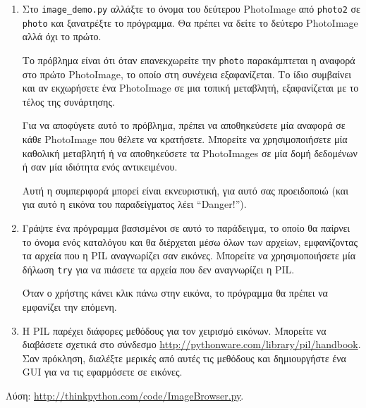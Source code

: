 \documentclass[10pt]{book}
\begin{document}
\begin{exercise}
\begin{enumerate}
\item Στο \verb"image_demo.py" αλλάξτε το όνομα του δεύτερου PhotoImage από {\tt photo2} σε {\tt photo}
και ξανατρέξτε το πρόγραμμα.  Θα πρέπει να δείτε το δεύτερο PhotoImage αλλά όχι το πρώτο.

Το πρόβλημα είναι ότι όταν επανεκχωρείτε την {\tt photo} παρακάμπτεται η αναφορά στο πρώτο PhotoImage,
το οποίο στη συνέχεια εξαφανίζεται.  Το ίδιο συμβαίνει και αν εκχωρήσετε ένα PhotoImage σε μια τοπική
μεταβλητή, εξαφανίζεται με το τέλος της συνάρτησης.

Για να αποφύγετε αυτό το πρόβλημα, πρέπει να αποθηκεύσετε μία αναφορά σε κάθε PhotoImage που θέλετε να κρατήσετε.  Μπορείτε να χρησιμοποιήσετε μία καθολική μεταβλητή ή να αποθηκεύσετε τα PhotoImages σε μία δομή δεδομένων ή
σαν μία ιδιότητα ενός αντικειμένου.

Αυτή η συμπεριφορά μπορεί είναι εκνευριστική, για αυτό σας προειδοποιώ (και για αυτό η εικόνα του παραδείγματος
λέει ``Danger!'').

\item Γράψτε ένα πρόγραμμα βασισμένοι σε αυτό το παράδειγμα, το οποίο θα παίρνει το όνομα
ενός καταλόγου και θα διέρχεται μέσω όλων των αρχείων, εμφανίζοντας τα αρχεία που η PIL
αναγνωρίζει σαν εικόνες.  Μπορείτε να χρησιμοποιήσετε μία δήλωση {\tt try} για να πιάσετε
τα αρχεία που δεν αναγνωρίζει η PIL. 

Όταν ο χρήστης κάνει κλικ πάνω στην εικόνα, το πρόγραμμα θα πρέπει να εμφανίζει την επόμενη.

\item Η PIL παρέχει διάφορες μεθόδους για τον χειρισμό εικόνων. Μπορείτε να διαβάσετε σχετικά
στο σύνδεσμο \url{http://pythonware.com/library/pil/handbook}.  Σαν πρόκληση, διαλέξτε
μερικές από αυτές τις μεθόδους και δημιουργήστε ένα GUI για να τις εφαρμόσετε σε εικόνες.

\end{enumerate}

Λύση: \url{http://thinkpython.com/code/ImageBrowser.py}.
\\
\end{exercise}
\end{document}
